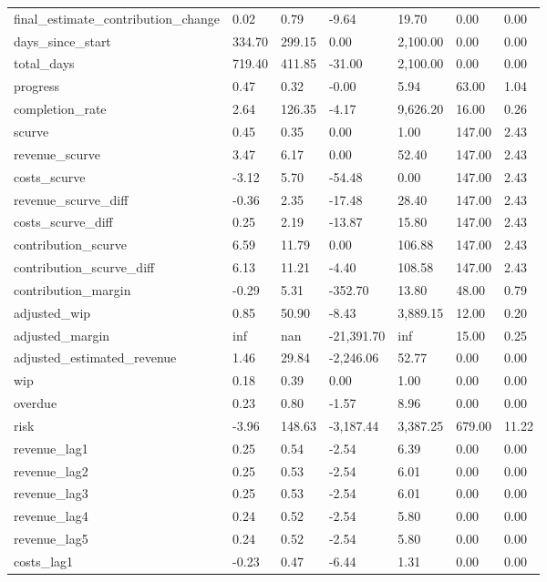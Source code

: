 \begin{landscape}
\begin{longtable}[h!]{lllllll}
final_estimate_contribution_change & 0.02 & 0.79 & -9.64 & 19.70 & 0.00 & 0.00 \\
days_since_start & 334.70 & 299.15 & 0.00 & 2,100.00 & 0.00 & 0.00 \\
total_days & 719.40 & 411.85 & -31.00 & 2,100.00 & 0.00 & 0.00 \\
progress & 0.47 & 0.32 & -0.00 & 5.94 & 63.00 & 1.04 \\
completion_rate & 2.64 & 126.35 & -4.17 & 9,626.20 & 16.00 & 0.26 \\
scurve & 0.45 & 0.35 & 0.00 & 1.00 & 147.00 & 2.43 \\
revenue_scurve & 3.47 & 6.17 & 0.00 & 52.40 & 147.00 & 2.43 \\
costs_scurve & -3.12 & 5.70 & -54.48 & 0.00 & 147.00 & 2.43 \\
revenue_scurve_diff & -0.36 & 2.35 & -17.48 & 28.40 & 147.00 & 2.43 \\
costs_scurve_diff & 0.25 & 2.19 & -13.87 & 15.80 & 147.00 & 2.43 \\
contribution_scurve & 6.59 & 11.79 & 0.00 & 106.88 & 147.00 & 2.43 \\
contribution_scurve_diff & 6.13 & 11.21 & -4.40 & 108.58 & 147.00 & 2.43 \\
contribution_margin & -0.29 & 5.31 & -352.70 & 13.80 & 48.00 & 0.79 \\
adjusted_wip & 0.85 & 50.90 & -8.43 & 3,889.15 & 12.00 & 0.20 \\
adjusted_margin & inf & nan & -21,391.70 & inf & 15.00 & 0.25 \\
adjusted_estimated_revenue & 1.46 & 29.84 & -2,246.06 & 52.77 & 0.00 & 0.00 \\
wip & 0.18 & 0.39 & 0.00 & 1.00 & 0.00 & 0.00 \\
overdue & 0.23 & 0.80 & -1.57 & 8.96 & 0.00 & 0.00 \\
risk & -3.96 & 148.63 & -3,187.44 & 3,387.25 & 679.00 & 11.22 \\
revenue_lag1 & 0.25 & 0.54 & -2.54 & 6.39 & 0.00 & 0.00 \\
revenue_lag2 & 0.25 & 0.53 & -2.54 & 6.01 & 0.00 & 0.00 \\
revenue_lag3 & 0.25 & 0.53 & -2.54 & 6.01 & 0.00 & 0.00 \\
revenue_lag4 & 0.24 & 0.52 & -2.54 & 5.80 & 0.00 & 0.00 \\
revenue_lag5 & 0.24 & 0.52 & -2.54 & 5.80 & 0.00 & 0.00 \\
costs_lag1 & -0.23 & 0.47 & -6.44 & 1.31 & 0.00 & 0.00 \\

\end{longtable}
\end{landscape}
